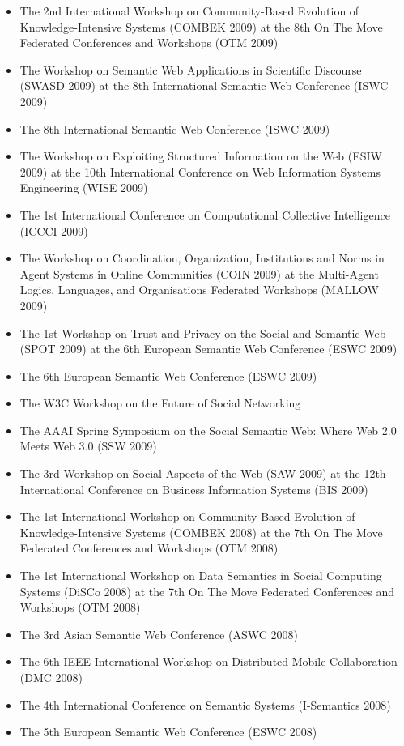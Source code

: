 \documentclass[10pt,a4paper]{res} %
\begin{document}
\begin{resume}
\begin{itemize}
\item The 2nd International Workshop on Community-Based Evolution of Knowledge-Intensive Systems (COMBEK 2009) at the 8th On The Move Federated Conferences and Workshops (OTM 2009)
\item The Workshop on Semantic Web Applications in Scientific Discourse (SWASD 2009) at the 8th International Semantic Web Conference (ISWC 2009)
\item The 8th International Semantic Web Conference (ISWC 2009)
\item The Workshop on Exploiting Structured Information on the Web (ESIW 2009) at the 10th International Conference on Web Information Systems Engineering (WISE 2009)
\item The 1st International Conference on Computational Collective Intelligence (ICCCI 2009)
\item The Workshop on Coordination, Organization, Institutions and Norms in Agent Systems in Online Communities (COIN 2009) at the Multi-Agent Logics, Languages, and Organisations Federated Workshops (MALLOW 2009)
\item The 1st Workshop on Trust and Privacy on the Social and Semantic Web (SPOT 2009) at the 6th European Semantic Web Conference (ESWC 2009)
\item The 6th European Semantic Web Conference (ESWC 2009)
\item The W3C Workshop on the Future of Social Networking
\item The AAAI Spring Symposium on the Social Semantic Web: Where Web 2.0 Meets Web 3.0 (SSW 2009)
\item The 3rd Workshop on Social Aspects of the Web (SAW 2009) at the 12th International Conference on Business Information Systems (BIS 2009)
\item The 1st International Workshop on Community-Based Evolution of Knowledge-Intensive Systems (COMBEK 2008) at the 7th On The Move Federated Conferences and Workshops (OTM 2008)
\item The 1st International Workshop on Data Semantics in Social Computing Systems (DiSCo 2008) at the 7th On The Move Federated Conferences and Workshops (OTM 2008)
\item The 3rd Asian Semantic Web Conference (ASWC 2008)
\item The 6th IEEE International Workshop on Distributed Mobile Collaboration (DMC 2008)
\item The 4th International Conference on Semantic Systems (I-Semantics 2008)
\item The 5th European Semantic Web Conference (ESWC 2008)

\end{itemize}
\end{resume}
\end{document}
